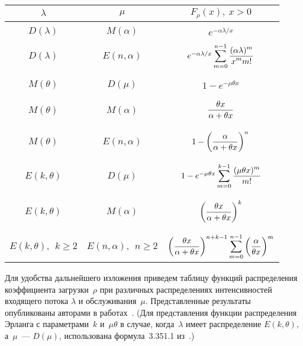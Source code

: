 \begin{multicols}{2}
\begin{table*}\small
\begin{center}
\vspace*{2ex}

\begin{tabular}{|c|c|c|}
\hline
$\lambda$&$\mu$&$F_\rho(x),\ x>0$\\
\hline
&&\\[-9pt]
$D(\lambda)$&$M(\alpha)$&$e^{-\alpha\lambda/x}$\\
\hline
&&\\[-9pt]
$D(\lambda)$&$E(n,\alpha)$&$e^{-\alpha\lambda/x}\displaystyle\sum\limits_{m=0}^{n-1}\displaystyle\frac{\displaystyle (\alpha\lambda)^m\mathstrut}{\displaystyle x^mm!\mathstrut}$\\
&&\\[-9pt]
\hline
&&\\[-9pt]
$M(\theta)$&$D(\mu)$&$1-e^{-\mu\theta x}$\\
&&\\[-9pt]
\hline
&&\\[-9pt]
$M(\theta)$&$M(\alpha)$&$\displaystyle\displaystyle\frac{\displaystyle \theta x\mathstrut}{\displaystyle \alpha+\theta x\mathstrut}$\\
&&\\[-9pt]
\hline
&&\\[-9pt]
$M(\theta)$&$E(n,\alpha)$&$1-\left(\displaystyle\displaystyle\frac{\displaystyle \alpha\mathstrut}{\displaystyle \alpha+\theta x\mathstrut}\right)^n$\\
&&\\[-9pt]
\hline
&&\\[-9pt]
$E(k,\theta)$&$D(\mu)$&$1-e^{-\mu\theta x}\displaystyle\sum\limits_{m=0}^{k-1}\displaystyle\displaystyle\frac{\displaystyle (\mu \theta x)^m\mathstrut}{\displaystyle m!\mathstrut}$\\
&&\\[-9pt]
\hline
&&\\[-9pt]
$E(k,\theta)$&$M(\alpha)$&$\left(\displaystyle\displaystyle\frac{\displaystyle \theta x\mathstrut}{\displaystyle \alpha+\theta x\mathstrut}\right)^k$\\
&&\\[-9pt]
\hline
&&\\[-9pt]
$E(k,\theta),\ \ k\ge2$&$E(n,\alpha),\ \ n\ge2$&$\left(\displaystyle\displaystyle\frac{\displaystyle \theta x\mathstrut}{\displaystyle \alpha+\theta x\mathstrut}\right)^{n+k-1}
\displaystyle\sum\limits_{m=0}^{n-1}\left(\displaystyle\displaystyle\frac{\displaystyle \alpha\mathstrut}{\displaystyle \theta x\mathstrut}\right)^m$\\[9pt]
\hline
\end{tabular}
\end{center}
\end{table*}

Для удобства дальнейшего изложения приведем таблицу функций
распределения коэффициента загрузки~$\rho$ при различных
распределениях интенсивностей входящего потока $\lambda$ и
обслуживания~$\mu$. Представленные результаты опубликованы авторами
в работах~\cite{KuSh07, KuSh09a, KuSh09b}. (Для представления
функции распределения Эрланга с параметрами~$k$ и~$\mu\theta$ в
случае, когда~$\lambda$ имеет распределение $E(k,\theta)$, а~$\mu$~--- 
$D(\mu)$, использована формула~3.351.1 из~\cite{GR71}.)



\end{multicols}
